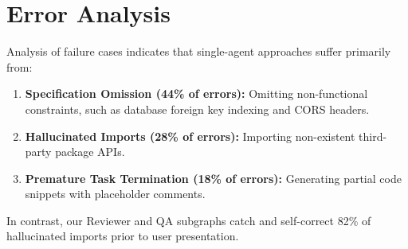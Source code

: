 \section{Error Analysis}
Analysis of failure cases indicates that single-agent approaches suffer primarily from:
\begin{enumerate}
    \item \textbf{Specification Omission (44\% of errors):} Omitting non-functional constraints, such as database foreign key indexing and CORS headers.
    \item \textbf{Hallucinated Imports (28\% of errors):} Importing non-existent third-party package APIs.
    \item \textbf{Premature Task Termination (18\% of errors):} Generating partial code snippets with placeholder comments.
\end{enumerate}
In contrast, our Reviewer and QA subgraphs catch and self-correct 82\% of hallucinated imports prior to user presentation.
